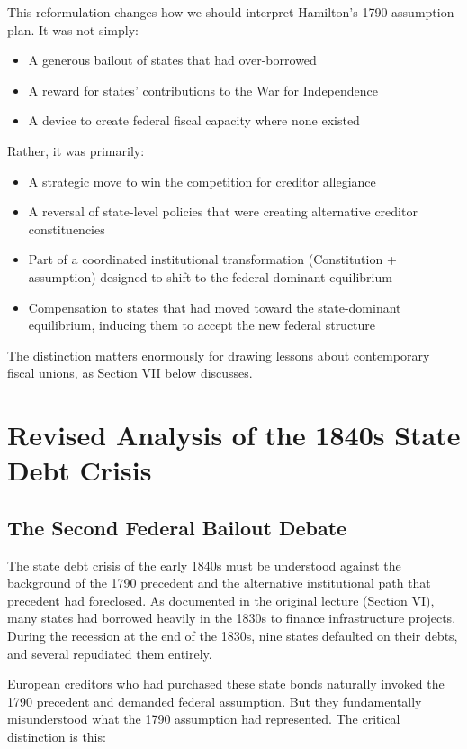 \documentclass[12pt]{article}
\begin{document}
This reformulation changes how we should interpret Hamilton's 1790 assumption plan. It was not simply:
\begin{itemize}
\item A generous bailout of states that had over-borrowed
\item A reward for states' contributions to the War for Independence
\item A device to create federal fiscal capacity where none existed
\end{itemize}

Rather, it was primarily:
\begin{itemize}
\item A strategic move to win the competition for creditor allegiance
\item A reversal of state-level policies that were creating alternative creditor constituencies
\item Part of a coordinated institutional transformation (Constitution + assumption) designed to shift to the federal-dominant equilibrium
\item Compensation to states that had moved toward the state-dominant equilibrium, inducing them to accept the new federal structure
\end{itemize}

The distinction matters enormously for drawing lessons about contemporary fiscal unions, as Section VII below discusses.

\section{Revised Analysis of the 1840s State Debt Crisis}

\subsection{The Second Federal Bailout Debate}

The state debt crisis of the early 1840s must be understood against the background of the 1790 precedent and the alternative institutional path that precedent had foreclosed. As documented in the original lecture (Section VI), many states had borrowed heavily in the 1830s to finance infrastructure projects. During the recession at the end of the 1830s, nine states defaulted on their debts, and several repudiated them entirely.

European creditors who had purchased these state bonds naturally invoked the 1790 precedent and demanded federal assumption. But they fundamentally misunderstood what the 1790 assumption had represented. The critical distinction is this:
\end{document}
